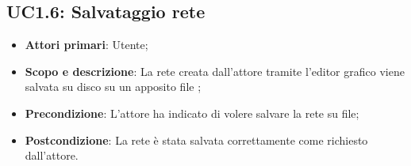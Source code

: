 \subsection{UC1.6: Salvataggio rete} 
\hypertarget{UC1.6}{} 
\begin{itemize} 
	\item{\textbf{Attori primari}: Utente;} 
	\item{\textbf{Scopo e descrizione}: La rete creata dall'attore tramite l'editor grafico viene salvata su disco su un apposito file ;} 
	\item{\textbf{Precondizione}: L'attore ha indicato di volere salvare la rete su file;} 
	\item{\textbf{Postcondizione}: La rete è stata salvata correttamente come richiesto dall'attore.} 
\end{itemize} 
